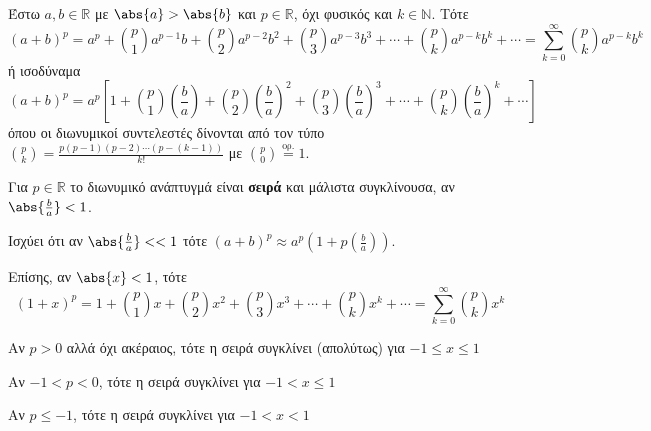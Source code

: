 Έστω $ a,b \in \mathbb{R} $ με $ \abs{a} > \abs{b} $ και $ p \in \mathbb{R} $, όχι
φυσικός και $ k \in \mathbb{N} $. Τότε
\[
  \boxed{(a+b)^{p} = a^{p} + \binom{p}{1} a^{p-1}b + \binom{p}{2} a^{p-2}b^{2} +
    \binom{p}{3} a^{p-3}b^{3} + \cdots + \binom{p}{k} a^{p-k}b^{k} + \cdots =
  \sum_{k=0}^{\infty} \binom{p}{k} a^{p-k}b^{k}}
\] 
ή ισοδύναμα
\[
  (a+b)^{p} = a^{p}\left[1 + \binom{p}{1} \left(\frac{b}{a}\right)+ \binom{p}{2} 
    \left(\frac{b}{a}\right)^{2}+ \binom{p}{3} \left(\frac{b}{ a}\right)^{3}+ \cdots + 
  \binom{p}{k} \left(\frac{b}{a}\right)^{k}+ \cdots\right]
\] 
όπου οι διωνυμικοί συντελεστές δίνονται από τον τύπο
$
\binom{p}{k} = \frac{p(p-1)(p-2)\cdots (p-(k-1))}{k!} 
$ με $ \binom{p}{0} \overset{\text{ορ.}}{=} 1 $.
\begin{rem}
\item {}
  Για $ p \in \mathbb{R} $ το διωνυμικό ανάπτυγμά είναι \textbf{σειρά}
  και μάλιστα συγκλίνουσα, αν $ \abs{\frac{b}{a}} < 1 $. 

  Ισχύει ότι αν $ \abs{\frac{b}{a}} < < 1  $ τότε  
  $ (a+b)^{p} \approx a^{p}\left(1+p\left(\frac{b}{a}\right)\right)  $. 
\end{rem}
Επίσης, αν $ \abs{x} < 1 $, τότε
\[
  \boxed{(1+x)^{p} = 
   1 + \binom{p}{1} x + \binom{p}{2} x^{2} + \binom{p}{3} x^{3} + 
  \cdots + \binom{p}{k} x^{k} + \cdots = 
  \sum_{k=0}^{\infty} \binom{p}{k} x^{k}}
\]
\begin{rem}
\item {}
  \begin{myitemize}
    \item Αν $ p>0 $ αλλά όχι ακέραιος, τότε η σειρά συγκλίνει (απολύτως) για $ -1 \leq x
      \leq 1 $
    \item Αν $-1<p<0$, τότε η σειρά συγκλίνει για $ -1 < x \leq 1 $
    \item Αν $p \leq -1$, τότε η σειρά συγκλίνει για $ -1 < x < 1 $
  \end{myitemize}
\end{rem}


